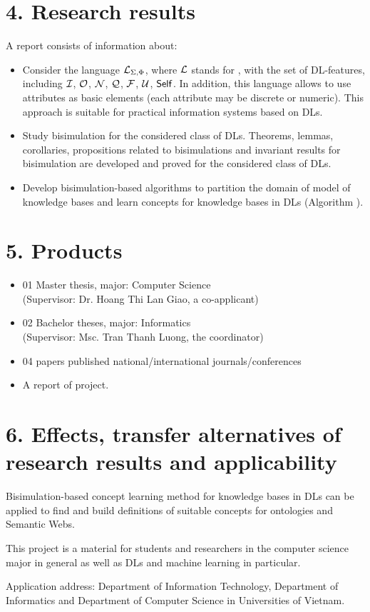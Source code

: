 \section*{4. Research results}
A report consists of information about:
\begin{itemize}
	\item Consider the language $\mathcal{L}_{\Sigma,\Phi}$, where $\mathcal{L}$ stands for \ALCreg, with the set of DL-features, including $\mathcal{I}$, $\mathcal{O}$, $\mathcal{N}$, $\mathcal{Q}$, $\mathcal{F}$, $\mathcal{U}$, $\mathsf{Self}$. In addition, this language allows to use attributes as basic elements (each attribute may be discrete or numeric). This approach is suitable for practical information systems
	based on DLs.
	
	\item Study bisimulation for the considered class of DLs. Theorems, lemmas, corollaries, propositions related to bisimulations and invariant results for bisimulation are developed and proved for the considered class of DLs.
	
	\item Develop bisimulation-based algorithms to partition the domain of model of knowledge bases and learn concepts for knowledge bases in DLs (Algorithm \BBCLearnS).
\end{itemize}
\section*{5. Products}
\begin{itemize}
	\item 01 Master thesis, major: Computer Science\\
	(Supervisor: Dr. Hoang Thi Lan Giao, a co-applicant)
	\item 02 Bachelor theses, major: Informatics\\
	(Supervisor: Msc. Tran Thanh Luong, the coordinator)
	\item 04 papers published national/international journals/conferences
	\item A report of project.
\end{itemize}

\section*{6. Effects, transfer alternatives of research results and applicability}
Bisimulation-based concept learning method for knowledge bases in DLs can be applied to find and build definitions of suitable concepts for ontologies and Semantic Webs.

This project is a material for students and researchers in the computer science major in general as well as DLs and machine learning in particular.

Application address: Department of Information Technology, Department of Informatics and Department of Computer Science in Universities of Vietnam.

\cleardoublepage